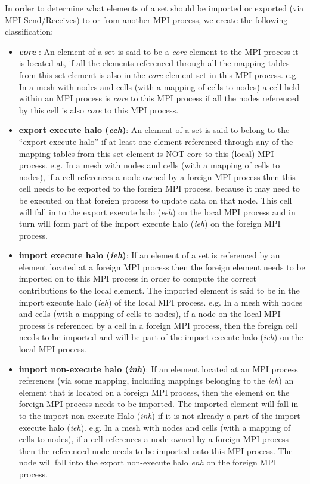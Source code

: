 \documentclass[11pt]{article}
\begin{document}
\noindent In order to determine what elements of a set should be imported or
exported (via MPI Send/Receives) to or from another MPI process, we create the
following classification:
\begin{itemize}
\item \textbf{\textit{core}} : An element of a set is said to be a \textit{core}
element to the MPI process it is located at, if all the elements referenced
through all the mapping tables from this set element is also in the
\textit{core} element set in this MPI process. e.g. In a mesh with nodes and
cells (with a mapping of cells to nodes) a cell held within an MPI process is
\textit{core} to this MPI process if all the nodes referenced by this cell is
also \textit{core} to this MPI process.

\item \textbf{export execute halo (\textit{eeh})}: An element of a set is said
to belong to the ``export execute halo'' if at least one element referenced
through any of the mapping tables from this set element is NOT core to this
(local) MPI process. e.g. In a mesh with nodes and cells (with a mapping of
cells to nodes), if a cell references a node owned by a foreign MPI process then
this cell needs to be exported to the foreign MPI process, because it may need
to be executed on that foreign process to update data on that node. This cell
will fall in to the export execute halo (\textit{eeh}) on the local MPI process
and in turn will form part of the import execute halo (\textit{ieh}) on the
foreign MPI process.

\item \textbf{import execute halo (\textit{ieh})}: If an element of a set is
referenced by an element located at a foreign MPI process then the foreign
element needs to be imported on to this MPI process in order to compute the
correct contributions to the local element. The imported element is said to be
in the import execute halo (\textit{ieh}) of the local MPI process. e.g. In a
mesh with nodes and cells (with a mapping of cells to nodes), if a node on the
local MPI process is referenced by a cell in a foreign MPI process, then the
foreign cell needs to be imported and will be part of the import execute halo
(\textit{ieh}) on the local MPI process.

\item \textbf{import non-execute halo (\textit{inh})}: If an element located at
an MPI process references (via some mapping, including mappings belonging to
the \textit{ieh}) an element that is located on a foreign MPI process, then the
element on the foreign MPI process needs to be imported. The imported element
will fall in to the import non-execute Halo (\textit{inh}) if it is not already
a part of the import execute halo (\textit{ieh}). e.g. In a mesh with nodes and
cells (with a mapping of cells to nodes), if a cell references a node owned by a
foreign MPI process then the referenced node needs to be imported onto this MPI
process. The node will fall into the export non-execute halo \textit{enh} on the
foreign MPI process.


\end{itemize}
\end{document}

